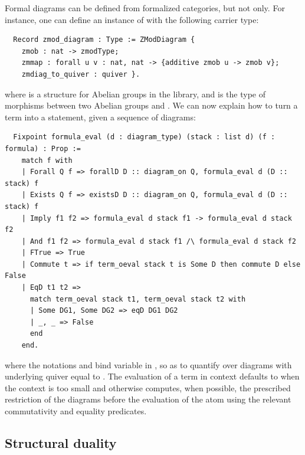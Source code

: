 \documentclass[a4paper,UKenglish,cleveref, autoref, thm-restate]{lipics-v2021}
\begin{document}
Formal diagrams can be defined from formalized categories, but not only. For instance, one can define an instance of  with the following carrier type:
\begin{verbatim}
  Record zmod_diagram : Type := ZModDiagram {
    zmob : nat -> zmodType;
    zmmap : forall u v : nat, nat -> {additive zmob u -> zmob v};
    zmdiag_to_quiver : quiver }.
\end{verbatim}
where  is a structure for Abelian groups in the \MC{} library, and  is the type of morphisms between two Abelian groups  and . We can now explain how to turn a term  into a \Coq{} statement, given a sequence of diagrams:
\begin{verbatim}
  Fixpoint formula_eval (d : diagram_type) (stack : list d) (f : formula) : Prop :=
    match f with
    | Forall Q f => forallD D :: diagram_on Q, formula_eval d (D :: stack) f
    | Exists Q f => existsD D :: diagram_on Q, formula_eval d (D :: stack) f
    | Imply f1 f2 => formula_eval d stack f1 -> formula_eval d stack f2
    | And f1 f2 => formula_eval d stack f1 /\ formula_eval d stack f2
    | FTrue => True
    | Commute t => if term_oeval stack t is Some D then commute D else False
    | EqD t1 t2 =>
      match term_oeval stack t1, term_oeval stack t2 with
      | Some DG1, Some DG2 => eqD DG1 DG2
      | _, _ => False
      end
    end.
\end{verbatim}
where the notations  and  bind variable  in , so as to quantify  over diagrams  with underlying quiver  equal to . The evaluation  of a term  in context  defaults to  when the context  is too small and otherwise computes, when possible, the prescribed restriction of the diagrams before the evaluation of the atom using the relevant commutativity and equality predicates.



\subsection{Structural duality}\label{ssec:dual}
\end{document}
